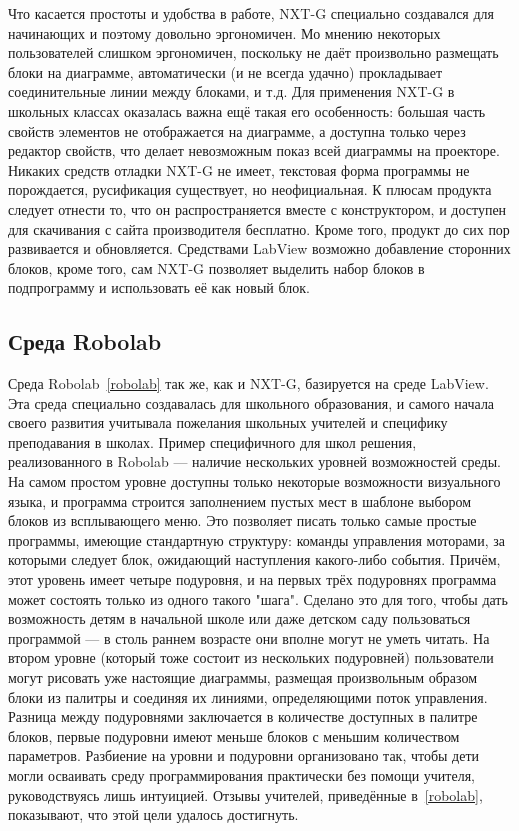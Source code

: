 \documentclass[a4paper]{article}
\begin{document}
Что касается простоты и удобства в работе, NXT-G специально создавался для начинающих и поэтому довольно эргономичен. Мо мнению некоторых пользователей слишком эргономичен, поскольку не даёт произвольно размещать блоки на диаграмме, автоматически (и не всегда удачно) прокладывает соединительные линии между блоками, и т.д. Для применения NXT-G в школьных классах оказалась важна ещё такая его особенность: большая часть свойств элементов не отображается на диаграмме, а доступна только через редактор свойств, что делает невозможным показ всей диаграммы на проекторе. Никаких средств отладки NXT-G не имеет, текстовая форма программы не порождается, русификация существует, но неофициальная. К плюсам продукта следует отнести то, что он распространяется вместе с конструктором, и доступен для скачивания с сайта производителя бесплатно. Кроме того, продукт до сих пор развивается и обновляется. Средствами LabView возможно добавление сторонних блоков, кроме того, сам NXT-G позволяет выделить набор блоков в подпрограмму и использовать её как новый блок.

\subsection{Среда Robolab}
Среда Robolab~\ref{robolab} так же, как и NXT-G, базируется на среде LabView. Эта среда специально создавалась для школьного образования, и самого начала своего развития учитывала пожелания школьных учителей и специфику преподавания в школах. Пример специфичного для школ решения, реализованного в Robolab --- наличие нескольких уровней возможностей среды. На самом простом уровне доступны только некоторые возможности визуального языка, и программа строится заполнением пустых мест в шаблоне выбором блоков из всплывающего меню. Это позволяет писать только самые простые программы, имеющие стандартную структуру: команды управления моторами, за которыми следует блок, ожидающий наступления какого-либо события. Причём, этот уровень имеет четыре подуровня, и на первых трёх подуровнях программа может состоять только из одного такого "шага". Сделано это для того, чтобы дать возможность детям в начальной школе или даже детском саду пользоваться программой --- в столь раннем возрасте они вполне могут не уметь читать. На втором уровне (который тоже состоит из нескольких подуровней) пользователи могут рисовать уже настоящие диаграммы, размещая произвольным образом блоки из палитры и соединяя их линиями, определяющими поток управления. Разница между подуровнями заключается в количестве доступных в палитре блоков, первые подуровни имеют меньше блоков с меньшим количеством параметров. Разбиение на уровни и подуровни организовано так, чтобы дети могли осваивать среду программирования практически без помощи учителя, руководствуясь лишь интуицией. Отзывы учителей, приведённые в~\ref{robolab}, показывают, что этой цели удалось достигнуть.
\end{document}
